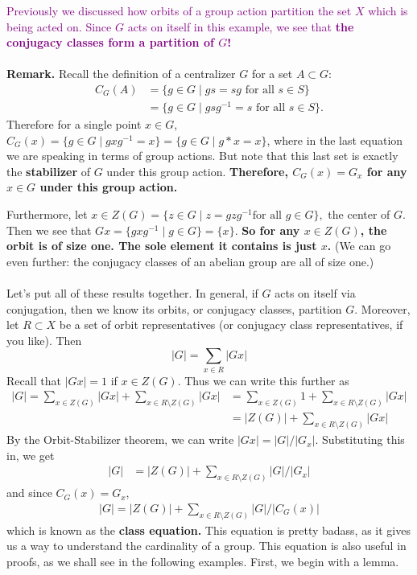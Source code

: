 \documentclass[12pt,letterpaper]{algebra_book}
\theoremstyle{definition}
\begin{document}
    \textcolor{purple}{Previously we discussed how orbits of a group action partition the
    set $X$ which is being acted on. Since $G$ acts on itself in this
    example, we see that \textbf{the conjugacy classes form a
    partition of $G$!}}
    \\
    \\
    \textbf{Remark.}
    Recall the definition of a centralizer $G$ for a set $A \subset
    G$: 
    \begin{align*}
        C_G(A) & = \{g \in G \mid gs = sg \text{ for all } s \in S\}\\
        & = \{g \in G \mid gsg^{-1} = s  \text{ for all } s \in S\}.
    \end{align*}
    Therefore for a single point $x \in G$, $C_G(x) = \{g \in G \mid
    gxg^{-1} = x \} = \{g \in G \mid g * x = x\}$, where in the last
    equation we are speaking in terms of group actions. But note that
    this last set is exactly the \textbf{stabilizer} of $G$ under this
    group action. \textbf{\textcolor{NavyBlue}{Therefore, $C_G(x) = G_x$ for any $x \in G$ under
    this group action.}}

    Furthermore, let $x \in Z(G) = \{z \in G \mid z = gzg^{-1} \text{
    for all } g \in G\},$ the center of $G$. Then we see that $Gx =
    \{gxg^{-1} \mid g \in G\} = \{x\}$. \textbf{\textcolor{NavyBlue}{So for any $x \in Z(G)$, the
    orbit is of size one. The sole element it contains is just $x$.}} (We can go even further: the conjugacy
    classes of an abelian group are all of size one.)
    \\
    \\
    Let's put all of these results together. In general, if $G$
    acts on itself via conjugation, then we know its orbits, or
    conjugacy classes, partition $G$. Moreover, let $R \subset X$ be a set of
    orbit representatives (or conjugacy class representatives, if you
    like). Then 
    \[
        |G| = \sum_{x \in R}|Gx|
    \]
    Recall that $|Gx| = 1$ if $x \in Z(G)$. Thus we can write this
    further as 
    \begin{align*}
        |G| = 
        \sum_{x \in Z(G)}|Gx| + \sum_{x \in R\setminus Z(G)} |Gx|
        & = \sum_{x \in Z(G)}1 + \sum_{x \in R\setminus Z(G)} |Gx|\\
        & = |Z(G)| + \sum_{x \in R\setminus Z(G)} |Gx|
    \end{align*}
    By the Orbit-Stabilizer theorem, we can write $|Gx| = |G|/|G_x|$.
    Substituting this in, we get 
    \begin{align*}
        |G| &= |Z(G)| + \sum_{x \in R\setminus Z(G)} |G|/|G_x|
    \end{align*}
    and since $C_G(x) = G_x$,
    \begin{align*}
        |G| = |Z(G)| + \sum_{x \in R\setminus Z(G)} |G|/|C_G(x)|
    \end{align*}
    which is known as the \textbf{class equation.} This equation is
    pretty badass, as it gives us a way to understand the cardinality
    of a group. This equation is also useful in proofs, as we shall
    see in the following examples. First, we begin with a lemma. 
\end{document}

